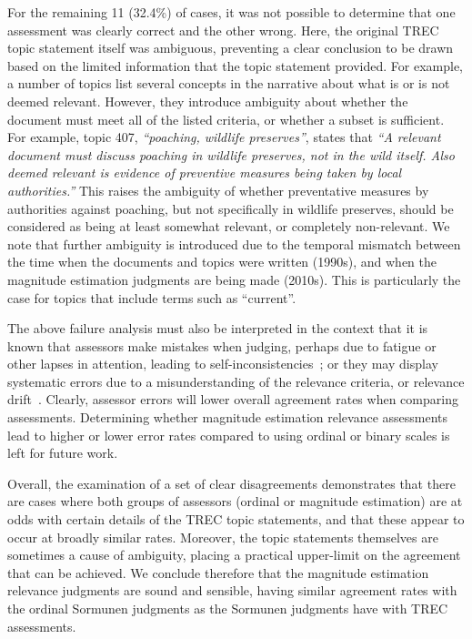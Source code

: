 For the remaining 11 (32.4\%) of cases, it was not possible to
determine that one assessment was clearly correct and the
other wrong.
Here, the original TREC topic statement itself was ambiguous,
preventing a clear conclusion to be drawn based on the limited
information that the topic statement provided.
For example, a number of topics list several concepts in the narrative
about what is or is not deemed relevant.
However, they introduce ambiguity about whether the document must meet
all of the listed criteria, or whether a subset is sufficient.
For example, topic 407, \emph{``poaching, wildlife preserves''}, states
that 
\emph{``A relevant document must discuss poaching in wildlife
preserves, not in the wild itself.
Also deemed relevant is evidence of preventive measures being taken by
local authorities.''} This raises the ambiguity of whether preventative
measures by authorities against poaching, but not specifically in
wildlife preserves, should be considered as being at least somewhat
relevant,
or completely non-relevant.
We note that further ambiguity is introduced due to the temporal
mismatch between the time when the documents and topics were written (1990s),
and when the magnitude estimation judgments are being made (2010s).
This is particularly the case for topics that include terms such as
``current''.

The above failure analysis must also be interpreted in the context 
that it is known that assessors make mistakes when judging, perhaps
due to fatigue or other lapses in attention, leading to
self-in{\-}con{\-}sistencies~\cite{CarSob10,SchTur11}; or they may display
systematic errors due to a misunderstanding of the relevance criteria, or
relevance drift~\cite{WebPic13}.
Clearly, assessor errors will lower overall agreement rates when
comparing assessments. Determining whether magnitude estimation relevance
assessments lead to higher or lower error rates compared to using
ordinal or binary
 scales is left
for future
work.

Overall, the examination of a set of clear disagreements demonstrates
that there are cases where both groups of assessors (ordinal or
magnitude estimation) are at odds with certain details of the TREC
topic statements, and that these appear to occur at broadly similar
rates. 
Moreover, the topic statements themselves are sometimes a cause of
ambiguity, placing a practical upper-limit on the agreement that can
be achieved.
We conclude therefore that the magnitude estimation relevance
judgments are sound and sensible, having similar agreement rates with
the ordinal Sormunen judgments as the Sormunen judgments have with
TREC assessments. 

